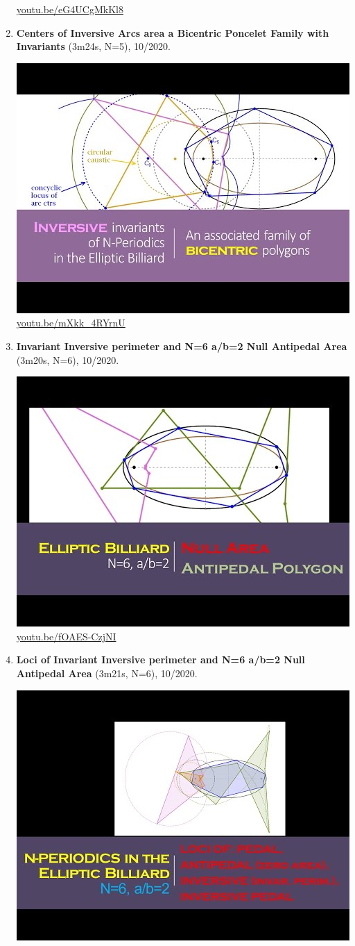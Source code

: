 \documentclass[12pt]{amsart}
\begin{document}
\begin{enumerate}[resume]
\begin{center}
\href{https://youtu.be/eG4UCgMkKl8}{\url{youtu.be/eG4UCgMkKl8}}\end{center}
% 
\item \textbf{Centers of Inversive Arcs area a Bicentric Poncelet Family with Invariants} (3m24s, N=5), 10/2020. 
\begin{center}\includegraphics[width=.5\textwidth]{pics/mXkk_4RYrnU.jpg} \\ 
\href{https://youtu.be/mXkk_4RYrnU}{\url{youtu.be/mXkk\_4RYrnU}}\end{center}
% 
\item \textbf{Invariant Inversive perimeter and N=6 a/b=2 Null Antipedal Area} (3m20s, N=6), 10/2020. 
\begin{center}\includegraphics[width=.5\textwidth]{pics/fOAES-CzjNI.jpg} \\ 
\href{https://youtu.be/fOAES-CzjNI}{\url{youtu.be/fOAES-CzjNI}}\end{center}
% 
\item \textbf{Loci of Invariant Inversive perimeter and N=6 a/b=2 Null Antipedal Area} (3m21s, N=6), 10/2020. 
\begin{center}\includegraphics[width=.5\textwidth]{pics/HMhZW_kWLGw.jpg} \\ 

\end{center}
\end{enumerate}
\end{document}
